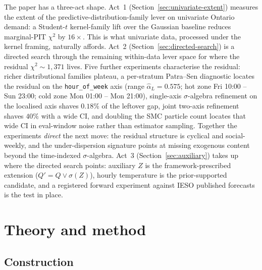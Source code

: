 The paper has a three-act shape. Act~1
(Section~\ref{sec:univariate-extent}) measures the extent of the
predictive-distribution-family lever on univariate Ontario demand:
a Student-$t$ kernel-family lift over the Gaussian baseline
reduces marginal-PIT $\chi^2$ by $16\times$. This is what
univariate data, processed under the kernel framing, naturally
affords. Act~2 (Section~\ref{sec:directed-search}) is a directed
search through the remaining within-data lever space for where
the residual $\chi^2 \sim 1{,}371$ lives. Five further experiments
characterise the residual: richer distributional families plateau,
a per-stratum Patra--Sen diagnostic locates the residual on the
\texttt{hour\_of\_week} axis (range $\hat\alpha_L = 0.575$; hot
zone Fri 10:00 -- Sun 23:00; cold zone Mon 01:00 -- Mon 21:00),
single-axis $\sigma$-algebra refinement on the localised axis
shaves $0.18\%$ of the leftover gap, joint two-axis refinement
shaves $40\%$ with a wide CI, and doubling the SMC particle count
locates that wide CI in eval-window noise rather than estimator
sampling. Together the experiments \emph{direct} the next move:
the residual structure is cyclical and social-weekly, and the
under-dispersion signature points at missing exogenous content
beyond the time-indexed $\sigma$-algebra. Act~3
(Section~\ref{sec:auxiliary}) takes up where the directed search
points: auxiliary $Z$ is the framework-prescribed extension
($Q' = Q \vee \sigma(Z)$), hourly temperature is the
prior-supported candidate, and a registered forward experiment
against IESO published forecasts is the test in place.


\section{Theory and method}
\label{sec:method}

\subsection{Construction}
\label{sec:construction}

